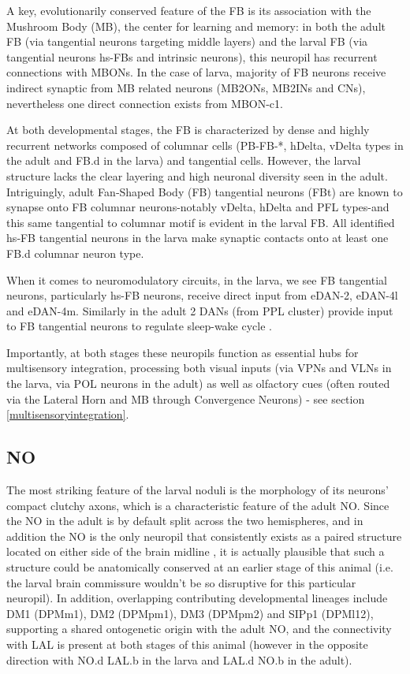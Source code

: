         A key, evolutionarily conserved feature of the FB is its association with the Mushroom Body (MB), the center for learning and memory: in both the adult FB (via tangential neurons targeting middle layers) and the larval FB (via tangential neurons hs-FBs and intrinsic neurons), this neuropil has recurrent connections with MBONs. In the case of larva, majority of FB neurons receive indirect synaptic from MB related neurons (MB2ONs, MB2INs and CNs), nevertheless one direct connection exists from MBON-c1.  
        
        At both developmental stages, the FB is characterized by dense and highly recurrent networks composed of columnar cells (PB-FB-*, hDelta, vDelta types in the adult and FB.d in the larva) and tangential cells. However, the larval structure lacks the clear layering and high neuronal diversity seen in the adult.  Intriguingly, adult Fan‑Shaped Body (FB) tangential neurons (FBt) are known to synapse onto FB columnar neurons-notably vDelta, hDelta and PFL types-and this same tangential to columnar motif is evident in the larval FB. All identified hs‑FB tangential neurons in the larva make synaptic contacts onto at least one FB.d columnar neuron type.

        When it comes to neuromodulatory circuits, in the larva, we see FB tangential neurons, particularly hs-FB neurons, receive direct input from eDAN-2, eDAN-4l and eDAN-4m. Similarly in the adult 2 DANs (from PPL cluster)  provide input to FB tangential neurons to regulate sleep-wake cycle \citep{liu2012two}. 
        
        Importantly, at both stages these neuropils function as essential hubs for multisensory integration, processing both visual inputs (via VPNs and VLNs in the larva, via POL neurons in the adult) as well as olfactory cues (often routed via the Lateral Horn and MB through Convergence Neurons) - see section \ref{multisensoryintegration}. 

       
        \subsection{NO}
        The most striking feature of the larval noduli is the morphology of its neurons' compact clutchy axons, which is a characteristic feature of the adult NO. Since the NO in the adult is by default split across the two hemispheres, and in addition the NO is the only neuropil that consistently exists as a paired structure located on either side of the brain midline \citep{heinze2024variations}, it is actually plausible that such a structure could be anatomically conserved at an earlier stage of this animal (i.e. the larval brain commissure wouldn't be so disruptive for this particular neuropil). In addition, overlapping contributing developmental lineages include DM1 (DPMm1), DM2 (DPMpm1), DM3 (DPMpm2) and SIPp1 (DPMl12), supporting a shared ontogenetic origin with the adult NO, and the connectivity with LAL is present at both stages of this animal (however in the opposite direction with NO.d LAL.b in the larva and LAL.d NO.b in the adult).

